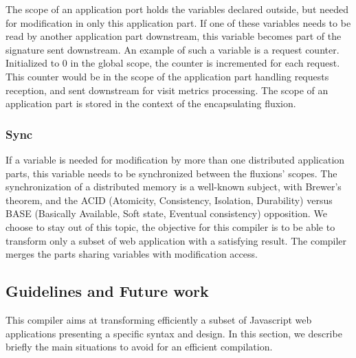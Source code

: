 The scope of an application port holds the variables declared outside, but needed for modification in only this application part.
If one of these variables needs to be read by another application part downstream, this variable becomes part of the signature sent downstream.
An example of such a variable is a request counter. Initialized to 0 in the global scope, the counter is incremented for each request.
This counter would be in the scope of the application part handling requests reception, and sent downstream for visit metrics processing.
The scope of an application part is stored in the context of the encapsulating fluxion.

\subsubsection{Sync}

If a variable is needed for modification by more than one distributed application parts, this variable needs to be synchronized between the fluxions' scopes.
The synchronization of a distributed memory is a well-known subject, with Brewer's theorem\cite{Gilbert2002}\cite{codahale2010}, and the ACID (Atomicity, Consistency, Isolation, Durability) versus BASE (Basically Available, Soft state, Eventual consistency) opposition\cite{Fox1997}.
We choose to stay out of this topic, the objective for this compiler is to be able to transform only a subset of web application with a satisfying result.
The compiler merges the parts sharing variables with modification access.

\subsection{Guidelines and Future work}

This compiler aims at transforming efficiently a subset of Javascript web applications presenting a specific syntax and design.
In this section, we describe briefly the main situations to avoid for an efficient compilation.

